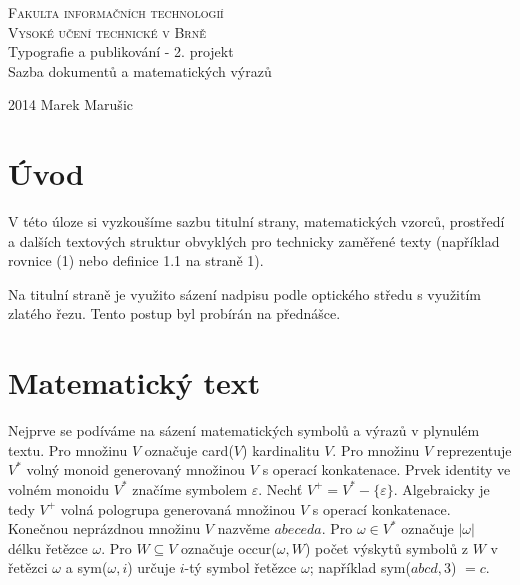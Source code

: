 \documentclass[twocolumn,11pt,a4paper]{article}
\theoremstyle{definition}
\begin{document}
\begin{titlepage}

\begin{center}
\Huge\textsc{Fakulta informačních technologií\\
Vysoké učení technické v Brně} \\
\LARGE Typografie a publikování - 2. projekt \\
Sazba dokumentů a matematických výrazů \\
\end{center}
{\Large 2014 \hspace{130mm}
Marek Marušic}
\end{titlepage}

\section*{Úvod}
V této úloze si vyzkoušíme sazbu titulní strany, matematických vzorců, prostředí a dalších textových struktur obvyklých pro technicky zaměřené texty (například rovnice (1) nebo definice 1.1 na straně 1).

Na titulní straně je využito sázení nadpisu podle optického středu s využitím zlatého řezu. Tento postup byl probírán na přednášce.

\section{Matematický text}
Nejprve se podíváme na sázení matematických symbolů a výrazů v plynulém textu. Pro množinu $V$ označuje card($V$) kardinalitu $V$.
Pro množinu $V$ reprezentuje $V^*$ volný monoid generovaný množinou $V$ s operací konkatenace.
Prvek identity ve volném monoidu $V^*$ značíme symbolem $\varepsilon$.
Nechť $V^+=V^*-\{\varepsilon\}$. Algebraicky je tedy $V^+$ volná pologrupa generovaná množinou $V$ s operací konkatenace.
Konečnou neprázdnou množinu $V$ nazvěme $abeceda$.
Pro $\omega\in V^*$ označuje $|\omega|$ délku řetězce $\omega$. Pro $W \subseteq V$ označuje occur($\omega,W$) počet výskytů symbolů z $W$ v řetězci $\omega$ a sym($\omega,i$) určuje $i$-tý symbol řetězce $\omega$; například sym($abcd,3$) $=c$.
\end{document}

